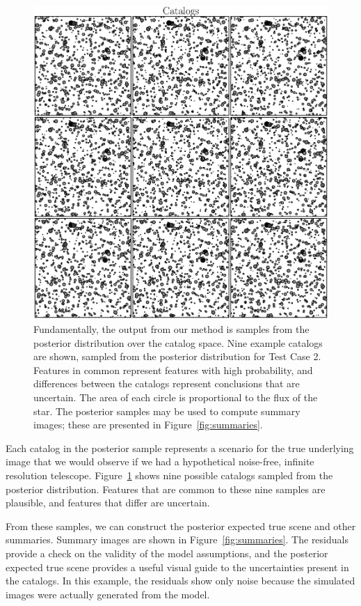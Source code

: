 \documentclass[12pt, preprint]{aastex}
\begin{document}
\begin{figure}[ht!]
\begin{center}
\includegraphics[scale=0.6]{Figures/catalogs.eps}
\end{center}
\caption{Fundamentally, the output from our method is samples from the posterior
distribution over the catalog space. Nine example catalogs are shown, sampled from the posterior distribution for
Test Case 2. Features in common represent features with high probability,
and differences between the catalogs represent conclusions that are uncertain.
The area of each circle is proportional to the flux of the star.
The posterior samples may be used to compute summary images; these are presented
in Figure~\ref{fig:summaries}.
\label{fig:catalogs}}
\end{figure}

Each catalog in the posterior sample represents a scenario for the true
underlying image that we would observe if we had a hypothetical noise-free,
infinite resolution telescope. Figure~\ref{fig:catalogs} shows nine possible catalogs
sampled from the posterior distribution. Features that are common to these nine samples are plausible, and features that differ are uncertain.

From these samples, we can construct the
posterior expected true scene and other summaries. Summary images are shown in Figure~\ref{fig:summaries}. The residuals
provide a check on the validity of the model assumptions, and the posterior expected true
scene provides a useful visual guide to the uncertainties present in the catalogs. In this example,
the residuals show only noise because the simulated images were actually generated from the model.
\end{document}
